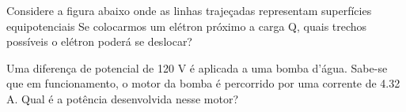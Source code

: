 \documentclass[12pt, addpoints]{exam}
\begin{document}
\begin{questions}
\begin{multicols*}{2}
\begin{oneparchoices}
\end{oneparchoices}
\question[20] Considere a figura abaixo onde as linhas trajeçadas representam superfícies equipotenciais Se colocarmos um elétron próximo a carga Q, quais trechos possíveis o elétron poderá se deslocar?
        
        \begin{center}
            \begin{minipage}[c]{0.5\linewidth}
            \end{minipage}
        \end{center}
        
        

\begin{oneparchoices}
\end{oneparchoices}
\question[20] Uma diferença de potencial de 120 V é aplicada a uma bomba d’água. Sabe-se que em funcionamento, o motor da bomba é percorrido por uma corrente de    4.32 A. Qual é a potência desenvolvida nesse motor?


\end{multicols*}
\end{questions}
\end{document}
